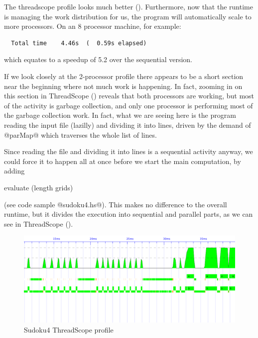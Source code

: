 The threadscope profile looks much better
().  Furthermore, now that the runtime is
managing the work distribution for us, the program will automatically
scale to more processors.  On an 8 processor machine, for example:

{\small \begin{verbatim}
  Total time    4.46s  (  0.59s elapsed)
\end{verbatim}}

\noindent which equates to a speedup of 5.2 over the sequential
version.

If we look closely at the 2-processor profile there appears to be a
short section near the beginning where not much work is happening.  In
fact, zooming in on this section in ThreadScope
() reveals that both processors
are working, but most of the activity is garbage collection, and only
one processor is performing most of the garbage collection work.  In
fact, what we are seeing here is the program reading the input file
(lazilly) and dividing it into lines, driven by the demand of @parMap@
which traverses the whole list of lines.

Since reading the file and dividing it into lines is a sequential
activity anyway, we could force it to happen all at once before we
start the main computation, by adding

\begin{haskell}
    evaluate (length grids)
\end{haskell}

\noindent (see code sample @sudoku4.hs@).  This makes no difference to
the overall runtime, but it divides the execution into sequential and
parallel parts, as we can see in ThreadScope
().

\begin{figure}
\begin{center}
\includegraphics[scale=0.4]{sudoku4.png}
\end{center}
\caption{Sudoku4 ThreadScope profile}
\label{fig:sudoku4-threadscope}
\end{figure}

